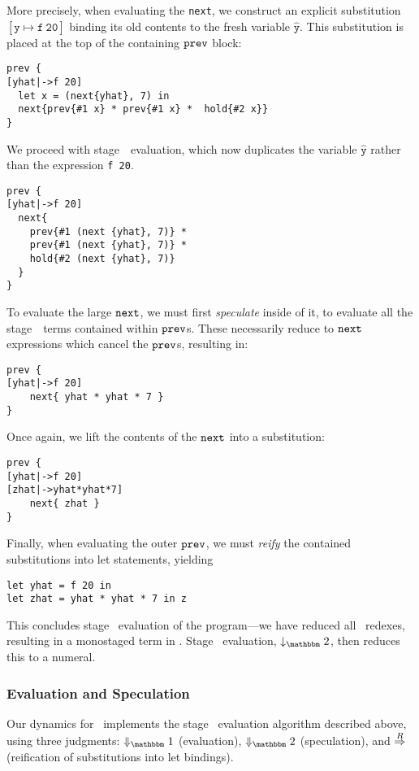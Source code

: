 More precisely, when evaluating the \verb|next|, we construct an explicit
substitution $\mathtt{[\hat y\mapsto f~20]}$ binding its old contents to the
fresh variable $\mathtt{\hat y}$. This substitution is placed at the top of the
containing ${\tt prev}$ block:
\begin{lstlisting} 
prev {
[yhat|->f 20]
  let x = (next{yhat}, 7) in
  next{prev{#1 x} * prev{#1 x} *  hold{#2 x}}
}
\end{lstlisting}
We proceed with stage~\bbone\ evaluation, which now duplicates the variable
$\mathtt{\hat y}$ rather than the expression \verb|f 20|.
\begin{lstlisting} 
prev {
[yhat|->f 20]
  next{
    prev{#1 (next {yhat}, 7)} * 
    prev{#1 (next {yhat}, 7)} *
    hold{#2 (next {yhat}, 7)}
  }
}
\end{lstlisting}
To evaluate the large ${\tt next}$, we must first \emph{speculate} inside of it, to
evaluate all the stage~\bbone\ terms contained within ${\tt prev}$s. These
necessarily reduce to ${\tt next}$ expressions which cancel the ${\tt prev}$s, resulting
in:
\begin{lstlisting} 
prev {
[yhat|->f 20]
    next{ yhat * yhat * 7 }
}
\end{lstlisting}
Once again, we lift the contents of the ${\tt next}$ into a substitution:
\begin{lstlisting} 
prev {
[yhat|->f 20]
[zhat|->yhat*yhat*7]
    next{ zhat }
}
\end{lstlisting}
Finally, when evaluating the outer ${\tt prev}$, we must {\em reify} the contained substitutions into let statements, yielding
\begin{lstlisting} 
let yhat = f 20 in
let zhat = yhat * yhat * 7 in z
\end{lstlisting}

This concludes stage \bbone\ evaluation of the program---we have reduced all
\bbone\ redexes, resulting in a monostaged term in \langTwo. Stage \bbtwo\
evaluation, $\tworedsym$, then reduces this to a numeral.

\subsubsection{Evaluation and Speculation}
\label{ssec:dynamics}



Our dynamics for \lang\ implements the stage \bbone\ evaluation algorithm
described above, using three judgments: $\redonesym$ (evaluation), $\redtwosym$
(speculation), and $\overset{R}\Rightarrow$ (reification of substitutions into let
bindings).

